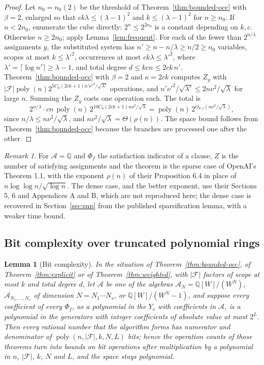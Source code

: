 \documentclass[11pt,reqno]{amsart}
\numberwithin{equation}{section}
\theoremstyle{plain}
\newtheorem{lemma}[theorem]{Lemma}
\theoremstyle{definition}
\theoremstyle{remark}
\newtheorem{remark}[theorem]{Remark}
\DeclareMathOperator{\poly}{poly}
\newcommand{\A}{\mathcal{A}}
\newcommand{\F}{\mathcal{F}}
\newcommand{\Q}{\mathbb{Q}}
\newcommand{\rhon}{\rho}
\newcommand{\oai}{OpenAI}
\begin{document}
\begin{proof}
Let $n_0=n_0(2)$ be the threshold of Theorem~\ref{thm:bounded-occ} with $\beta=2$,
enlarged so that $ck\lambda\le(\lambda-1)^2$ and $k\le(\lambda-1)^2$ for
$n\ge n_0$. If $n<2n_0$, enumerate the cube directly: $2^{n}\le 2^{2n_0}$ is a
constant depending on $k,c$. Otherwise $n\ge 2n_0$; apply Lemma~\ref{lem:frequent}. For each
of the fewer than $2^{n/\lambda}$ assignments $y$, the substituted system has
$n'\ge n-n/\lambda\ge n/2\ge n_0$ variables, scopes at most $k\le\lambda'^{2}$,
occurrences at most $ck\lambda\le\lambda'^{2}$, where $\lambda'=\lceil\log n'\rceil\ge\lambda-1$,
and total degree $d\le kcn\le 2ck\,n'$. Theorem~\ref{thm:bounded-occ} with
$\beta=2$ and $\kappa=2ck$ computes $Z_y$ with
$|\F|\poly(n)2^{5C_0(2ck+1)n'\nu'^2/\sqrt{\lambda'}}$ operations, and
$n'\nu'^2/\sqrt{\lambda'}\le 2n\nu^2/\sqrt\lambda$ for large $n$. Summing the
$Z_y$ costs one operation each. The total is
\[
  2^{n/\lambda}\cdot cn\,\poly(n)\,2^{10C_0(2ck+1)n\nu^2/\sqrt\lambda}
  =\poly(n)\,2^{O_{k,c}(n\nu^2/\sqrt\lambda)},
\]
since $n/\lambda\le n\nu^2/\sqrt\lambda$, and $n\nu^2/\sqrt\lambda=\Theta(\rhon(n))$.
The space bound follows from Theorem~\ref{thm:bounded-occ} because the branches
are processed one after the other.
\end{proof}

\begin{remark}
For $\A=\Q$ and $\Phi_f$ the satisfaction indicator of a clause, $Z$ is the number
of satisfying assignments and the theorem is the sparse case of
\oai{}'s Theorem 1.1, with the exponent $\rhon(n)$ of their Proposition 6.4 in
place of $n\log\log n/\sqrt{\log n}$. The dense case, and the better exponent, use
their Sections 5, 6 and Appendices A and B, which are not reproduced here; the
dense case is recovered in Section~\ref{sec:snp} from the published
sparsification lemma, with a weaker time bound.
\end{remark}

\subsection{Bit complexity over truncated polynomial rings}
\begin{lemma}[Bit complexity]\label{lem:bits}
In the situation of Theorem~\ref{thm:bounded-occ}, of Theorem~\ref{thm:explicit} or of Theorem~\ref{thm:weighted},
with $|\F|$ factors of scope at most $k$ and total degree $d$, let $\A$ be one of the algebras
$\A_N=\Q[W]/(W^N)$, $\A_{N_1,\dots,N_s}$ of dimension $N=N_1\cdots N_s$, or
$\Q[W]/(W^N-1)$, and suppose every coefficient of every $\Phi_f$, as a polynomial
in the $Y_v$ with coefficients in $\A$, is a polynomial in the generators with
integer coefficients of absolute value at most $2^{L}$. Then every rational number that the algorithm
forms has numerator and denominator of $\poly(n,|\F|,k,N,L)$ bits; hence the operation
counts of those theorems turn into bounds on bit operations after multiplication
by a polynomial in $n$, $|\F|$, $k$, $N$ and $L$, and the space stays polynomial.
\end{lemma}
\end{document}

